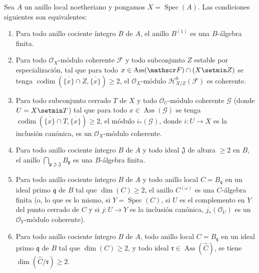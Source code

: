 \begin{proposition}[7.2.4]
\label{IV.2.s7.2.4-fr}
Sea $A$ un anillo local noetheriano y pongamos
$X=\operatorname{Spec}(A)$. Las condiciones siguientes son
equivalentes:
\begin{enumerate}
\item[\textup{a)}] Para todo anillo cociente íntegro $B$ de $A$, el anillo
$B^{(1)}$ es una $B$-álgebra finita.
\item[\textup{b)}] Para todo $\mathscr O_X$-módulo coherente $\mathscr F$ y
todo subconjunto $Z$ estable por especialización, tal que para todo
$x\in\operatorname{Ass}(\mathscr F)\cap(X\setmin Z)$ se tenga
$\operatorname{codim}(\overline{\{x\}}\cap Z,\overline{\{x\}})\geqslant2$, el $\mathscr O_X$-módulo
$\mathscr H^0_{X/Z}(\mathscr F)$ es coherente.
\item[\textup{c)}] Para todo subconjunto cerrado $T$ de $X$ y todo
$\mathscr O_U$-módulo coherente $\mathscr G$ (donde $U=X\setmin T$)
tal que para todo $x\in\operatorname{Ass}(\mathscr G)$ se tenga
$\operatorname{codim}(\overline{\{x\}}\cap T,\overline{\{x\}})\geqslant2$, el módulo $i_*(\mathscr G)$, donde
$i:U\to X$ es la inclusión canónica, es un
$\mathscr O_X$-módulo coherente.
\item[\textup{d)}] Para todo anillo cociente íntegro $B$ de $A$ y todo ideal
$\mathfrak J$ de altura $\geqslant2$ en $B$, el anillo
$\displaystyle\bigcap_{\mathfrak p\not\supset\mathfrak J}B_{\mathfrak p}$ es una $B$-álgebra finita.
\item[\textup{e)}] Para todo anillo cociente íntegro $B$ de $A$ y todo anillo
local $C=B_{\mathfrak q}$ en un ideal primo $\mathfrak q$ de $B$
tal que $\dim(C)\geqslant2$, el anillo $C^{(\omega)}$ es una
$C$-álgebra finita \textup{(o, lo que es lo mismo,} si
$Y=\operatorname{Spec}(C)$, si $U$ es el complemento en $Y$ del
punto cerrado de $C$ y si $j:U\to Y$ es la inclusión canónica,
$j_*(\mathscr O_U)$ es un $\mathscr O_Y$-módulo coherente).
\item[\textup{f)}] Para todo anillo cociente íntegro $B$ de $A$, todo
anillo local $C=B_{\mathfrak q}$ en un ideal primo $\mathfrak q$
de $B$ tal que $\dim(C)\geqslant2$, y todo ideal
$\mathfrak r\in\operatorname{Ass}(\widehat C)$, se tiene
$\dim(\widehat C/\mathfrak r)\geqslant2$.
\end{enumerate}
\end{proposition}
